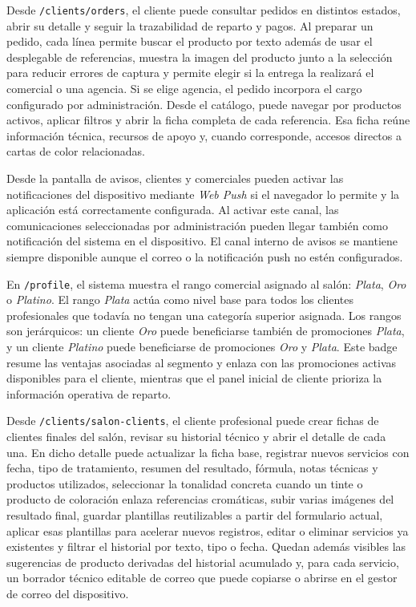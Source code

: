 Desde \texttt{/clients/orders}, el cliente puede consultar pedidos en distintos estados, abrir su detalle y seguir la trazabilidad de reparto y pagos. Al preparar un pedido, cada línea permite buscar el producto por texto además de usar el desplegable de referencias, muestra la imagen del producto junto a la selección para reducir errores de captura y permite elegir si la entrega la realizará el comercial o una agencia. Si se elige agencia, el pedido incorpora el cargo configurado por administración. Desde el catálogo, puede navegar por productos activos, aplicar filtros y abrir la ficha completa de cada referencia. Esa ficha reúne información técnica, recursos de apoyo y, cuando corresponde, accesos directos a cartas de color relacionadas.

Desde la pantalla de avisos, clientes y comerciales pueden activar las notificaciones del dispositivo mediante \textit{Web Push} si el navegador lo permite y la aplicación está correctamente configurada. Al activar este canal, las comunicaciones seleccionadas por administración pueden llegar también como notificación del sistema en el dispositivo. El canal interno de avisos se mantiene siempre disponible aunque el correo o la notificación push no estén configurados.

En \texttt{/profile}, el sistema muestra el rango comercial asignado al salón: \textit{Plata}, \textit{Oro} o \textit{Platino}. El rango \textit{Plata} actúa como nivel base para todos los clientes profesionales que todavía no tengan una categoría superior asignada. Los rangos son jerárquicos: un cliente \textit{Oro} puede beneficiarse también de promociones \textit{Plata}, y un cliente \textit{Platino} puede beneficiarse de promociones \textit{Oro} y \textit{Plata}. Este badge resume las ventajas asociadas al segmento y enlaza con las promociones activas disponibles para el cliente, mientras que el panel inicial de cliente prioriza la información operativa de reparto.

Desde \texttt{/clients/salon-clients}, el cliente profesional puede crear fichas de clientes finales del salón, revisar su historial técnico y abrir el detalle de cada una. En dicho detalle puede actualizar la ficha base, registrar nuevos servicios con fecha, tipo de tratamiento, resumen del resultado, fórmula, notas técnicas y productos utilizados, seleccionar la tonalidad concreta cuando un tinte o producto de coloración enlaza referencias cromáticas, subir varias imágenes del resultado final, guardar plantillas reutilizables a partir del formulario actual, aplicar esas plantillas para acelerar nuevos registros, editar o eliminar servicios ya existentes y filtrar el historial por texto, tipo o fecha. Quedan además visibles las sugerencias de producto derivadas del historial acumulado y, para cada servicio, un borrador técnico editable de correo que puede copiarse o abrirse en el gestor de correo del dispositivo.

